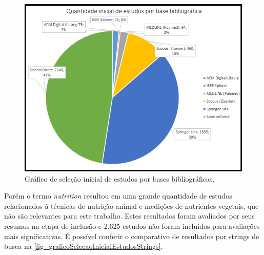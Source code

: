 \begin{figure}[htb]
	\caption{\label{fig_graficoSelecaoInicialEstudos}Gráfico de seleção inicial de estudos por bases bibliográficas.}
	\begin{center}
	    \includegraphics[scale=0.55]{Imagens/grafico - selecao inicial de estudos por base.png}
	\end{center}
\end{figure}

Porém o termo \textit{nutrition} resultou em uma grande quantidade de estudos relacionados à técnicas de nutrição animal e medições de nutrientes vegetais, que não são relevantes para este trabalho. Estes resultados foram avaliados por seus resumos na etapa de inclusão e 2.625 estudos não foram incluídos para avaliações mais significativas. É possível conferir o comparativo de resultados por strings de busca na \autoref{fig_graficoSelecaoInicialEstudosStrings}.

